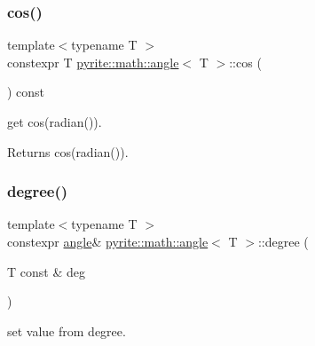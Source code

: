 \subsubsection{\texorpdfstring{cos()}{cos()}}
{\footnotesize\ttfamily template$<$typename T $>$ \\
constexpr T \mbox{\hyperlink{classpyrite_1_1math_1_1angle}{pyrite\+::math\+::angle}}$<$ T $>$\+::cos (\begin{DoxyParamCaption}{ }\end{DoxyParamCaption}) const\hspace{0.3cm}{\ttfamily [inline]}}

get cos(radian()). \begin{DoxyReturn}{Returns}
cos(radian()). 
\end{DoxyReturn}
\mbox{\label{classpyrite_1_1math_1_1angle_a7e27daa8c8cb81986a146495664dfaba}} 
\subsubsection{\texorpdfstring{degree()}{degree()}\hspace{0.1cm}{\footnotesize\ttfamily [1/2]}}
{\footnotesize\ttfamily template$<$typename T $>$ \\
constexpr \mbox{\hyperlink{classpyrite_1_1math_1_1angle}{angle}}\& \mbox{\hyperlink{classpyrite_1_1math_1_1angle}{pyrite\+::math\+::angle}}$<$ T $>$\+::degree (\begin{DoxyParamCaption}\item[{T const \&}]{deg }\end{DoxyParamCaption})\hspace{0.3cm}{\ttfamily [inline]}}

set value from degree.


